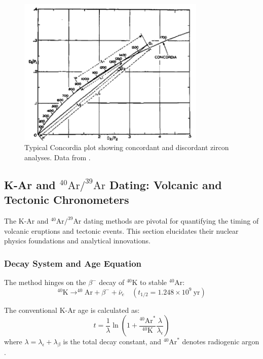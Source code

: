 \documentclass{article}
\begin{document}
\begin{figure}[htbp]
    \centering
    \includegraphics[width=0.8\textwidth]{concordia_plot.png}
    \caption{Typical Concordia plot showing concordant and discordant zircon analyses. Data from \cite{Wetherill1956}.}
    \label{fig:concordia}
\end{figure}

\subsection{K-Ar and \(^{40}\text{Ar}/^{39}\text{Ar}\) Dating: Volcanic and Tectonic Chronometers}
\label{subsec:ar_method}

The K-Ar and \(^{40}\text{Ar}/^{39}\text{Ar}\) dating methods are pivotal for quantifying the timing of volcanic eruptions and tectonic events. This section elucidates their nuclear physics foundations and analytical innovations.

\subsubsection*{Decay System and Age Equation}
The method hinges on the \(\beta^-\) decay of \(^{40}\text{K}\) to stable \(^{40}\text{Ar}\):
\begin{equation}
    ^{40}\text{K} \rightarrow ^{40}\text{Ar} + \beta^- + \bar{\nu}_e \quad (t_{1/2} = 1.248 \times 10^9\ \text{yr})
    \label{eq:k_decay}
\end{equation}

The conventional K-Ar age is calculated as:
\begin{equation}
    t = \frac{1}{\lambda} \ln\left(1 + \frac{{}^{40}\text{Ar}^*}{{}^{40}\text{K}} \frac{\lambda}{\lambda_{\epsilon}}\right)
    \label{eq:k_age}
\end{equation}
where \(\lambda = \lambda_{\epsilon} + \lambda_{\beta}\) is the total decay constant, and \(^{40}\text{Ar}^*\) denotes radiogenic argon \cite{Steiger1977}.
\end{document}
